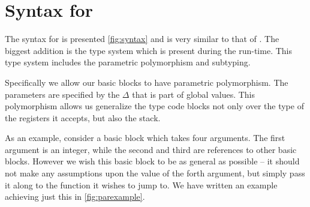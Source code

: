 \section{Syntax for \ATAL}

The syntax for \ATAL is presented \cref{fig:syntax} and is very similar to that
of \ATALe. The biggest addition is the type system which is present during the
run-time. This type system includes the parametric polymorphism and subtyping.

Specifically we allow our basic blocks to have parametric polymorphism. The
parameters are specified by the $\Delta$ that is part of global values. This
polymorphism allows us generalize the type code blocks not only over the type of
the registers it accepts, but also the stack.

As an example, consider a basic block which takes four arguments. The first
argument is an integer, while the second and third are references to other basic
blocks. However we wish this basic block to be as general as possible -- it
should not make any assumptions upon the value of the forth argument, but simply
pass it along to the function it wishes to jump to. We have written an example
achieving just this in \cref{fig:parexample}.

